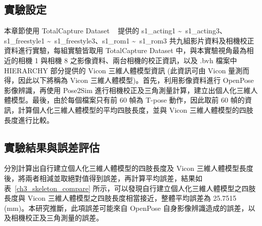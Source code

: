 \subsection{實驗設定}
本章節使用 TotalCapture Dataset ~\cite{Trumble:BMVC:2017} 提供的 s1\_acting1 \textasciitilde\ s1\_acting3、s1\_freestyle1 \textasciitilde\ s1\_freestyle3、s1\_rom1 \textasciitilde\ s1\_rom3 共九組影片資料及相機校正資料進行實驗，每組實驗皆取用 TotalCapture Dataset  中，與本實驗視角最為相近的相機 1 與相機 8 之影像資料、兩台相機的校正資訊，以及 .bvh 檔案中 HIERARCHY 部分提供的 Vicon 三維人體模型資訊 (此資訊可由 Vicon 量測而得，因此以下將稱為 Vicon 三維人體模型)。首先，利用影像資料進行 OpenPose 影像辨識，再使用 Pose2Sim 進行相機校正及三角測量計算，建立出個人化三維人體模型。最後，由於每個檔案只有前 60 幀為 T-pose 動作，因此取前 60 幀的資訊，計算個人化三維人體模型的平均四肢長度，並與 Vicon 三維人體模型的四肢長度進行比較。

\subsection{實驗結果與誤差評估}
分別計算出自行建立個人化三維人體模型的四肢長度及 Vicon 三維人體模型長度後，將兩者相減並取絕對值得到誤差，再計算平均誤差，結果如表~\ref{ch3_skeleton_compare} 所示，可以發現自行建立個人化三維人體模型之四肢長度與 Vicon 三維人體模型之四肢長度相當接近，整體平均誤差為 25.7515 (mm)。本研究推斷，此項誤差可能來自 OpenPose 自身影像辨識造成的誤差，以及相機校正及三角測量的誤差。

